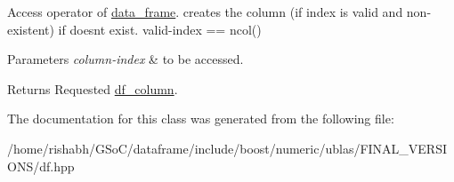 Access operator of \hyperlink{classboost_1_1numeric_1_1ublas_1_1data__frame}{data\+\_\+frame}. creates the column (if index is valid and non-\/existent) if doesn\textquotesingle{}t exist. valid-\/index == {\ttfamily ncol()} 


\begin{DoxyParams}{Parameters}
{\em column-\/index} & to be accessed. \\
\hline
\end{DoxyParams}
\begin{DoxyReturn}{Returns}
Requested \hyperlink{classboost_1_1numeric_1_1ublas_1_1df__column}{df\+\_\+column}. 
\end{DoxyReturn}


The documentation for this class was generated from the following file\+:\begin{DoxyCompactItemize}
\item 
/home/rishabh/\+G\+So\+C/dataframe/include/boost/numeric/ublas/\+F\+I\+N\+A\+L\+\_\+\+V\+E\+R\+S\+I\+O\+N\+S/df.\+hpp\end{DoxyCompactItemize}
